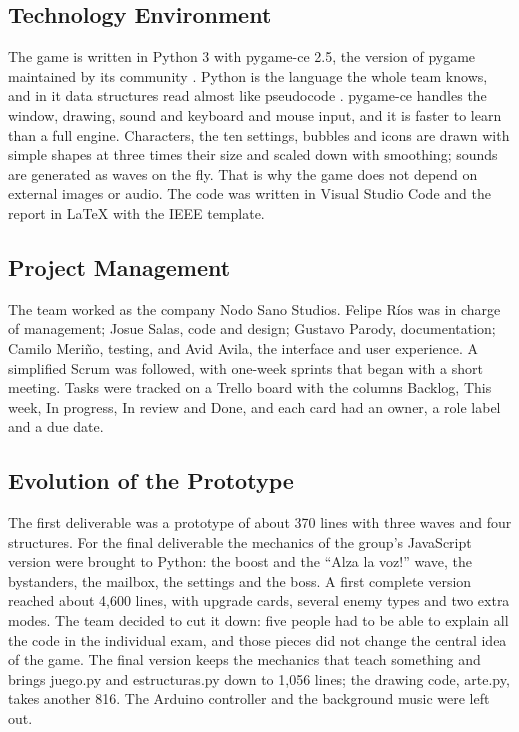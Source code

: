 \documentclass[conference]{IEEEtran}
\begin{document}
\subsection{Technology Environment}

The game is written in Python 3 with pygame-ce 2.5, the version of pygame maintained by its community \cite{ref10}. Python is the language the whole team knows, and in it data structures read almost like pseudocode \cite{ref11}. pygame-ce handles the window, drawing, sound and keyboard and mouse input, and it is faster to learn than a full engine. Characters, the ten settings, bubbles and icons are drawn with simple shapes at three times their size and scaled down with smoothing; sounds are generated as waves on the fly. That is why the game does not depend on external images or audio. The code was written in Visual Studio Code and the report in LaTeX with the IEEE template.

\subsection{Project Management}

The team worked as the company Nodo Sano Studios. Felipe Ríos was in charge of management; Josue Salas, code and design; Gustavo Parody, documentation; Camilo Meriño, testing, and Avid Avila, the interface and user experience. A simplified Scrum was followed, with one-week sprints that began with a short meeting. Tasks were tracked on a Trello board with the columns Backlog, This week, In progress, In review and Done, and each card had an owner, a role label and a due date.

\subsection{Evolution of the Prototype}

The first deliverable was a prototype of about 370 lines with three waves and four structures. For the final deliverable the mechanics of the group's JavaScript version were brought to Python: the boost and the ``\textexclamdown{}Alza la voz!'' wave, the bystanders, the mailbox, the settings and the boss. A first complete version reached about 4,600 lines, with upgrade cards, several enemy types and two extra modes. The team decided to cut it down: five people had to be able to explain all the code in the individual exam, and those pieces did not change the central idea of the game. The final version keeps the mechanics that teach something and brings juego.py and estructuras.py down to 1,056 lines; the drawing code, arte.py, takes another 816. The Arduino controller and the background music were left out.
\end{document}
